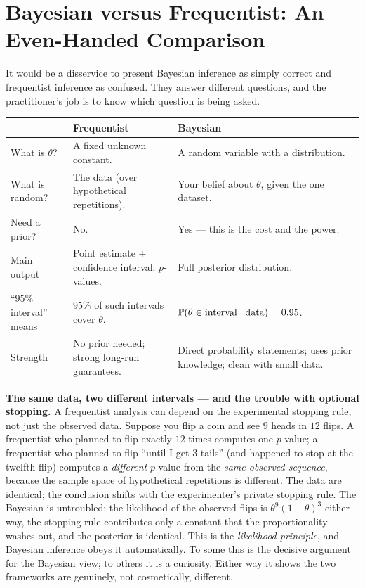 \section{Bayesian versus Frequentist: An Even-Handed Comparison}
\label{ch31:vs}

It would be a disservice to present Bayesian inference as simply correct and frequentist
inference as confused. They answer different questions, and the practitioner's job is to
know which question is being asked.

\begin{center}
\renewcommand{\arraystretch}{1.3}
\begin{tabular}{p{4.3cm} p{5.0cm} p{5.0cm}}
\toprule
 & \textbf{Frequentist} & \textbf{Bayesian} \\
\midrule
What is $\theta$? & A fixed unknown constant. & A random variable with a distribution. \\
What is random? & The data (over hypothetical repetitions). & Your belief about $\theta$, given the one dataset. \\
Need a prior? & No. & Yes --- this is the cost and the power. \\
Main output & Point estimate $+$ confidence interval; $p$-values. & Full posterior distribution. \\
``$95\%$ interval'' means & $95\%$ of such intervals cover $\theta$. & $\operatorname{\mathbb{P}}(\theta \in \text{interval}\mid\text{data})=0.95$. \\
Strength & No prior needed; strong long-run guarantees. & Direct probability statements; uses prior knowledge; clean with small data. \\
\bottomrule
\end{tabular}
\end{center}

\begin{paradoxbox}
\textbf{The same data, two different intervals --- and the trouble with optional stopping.}
A frequentist analysis can depend on the experimental stopping rule, not just the observed data. Suppose you flip a coin and see $9$ heads in $12$
flips. A frequentist who planned to flip exactly $12$ times computes one $p$-value; a
frequentist who planned to flip ``until I get $3$ tails'' (and happened to stop at the
twelfth flip) computes a \emph{different} $p$-value from the \emph{same observed sequence},
because the sample space of hypothetical repetitions is different. The data are identical;
the conclusion shifts with the experimenter's private stopping rule. The Bayesian is
untroubled: the likelihood of the observed flips is $\theta^9(1-\theta)^3$ either way, the
stopping rule contributes only a constant that the proportionality washes out, and the
posterior is identical. This is the \emph{likelihood principle}, and Bayesian inference
obeys it automatically. To some this is the decisive argument for the Bayesian view; to
others it is a curiosity. Either way it shows the two frameworks are genuinely, not
cosmetically, different.
\end{paradoxbox}

